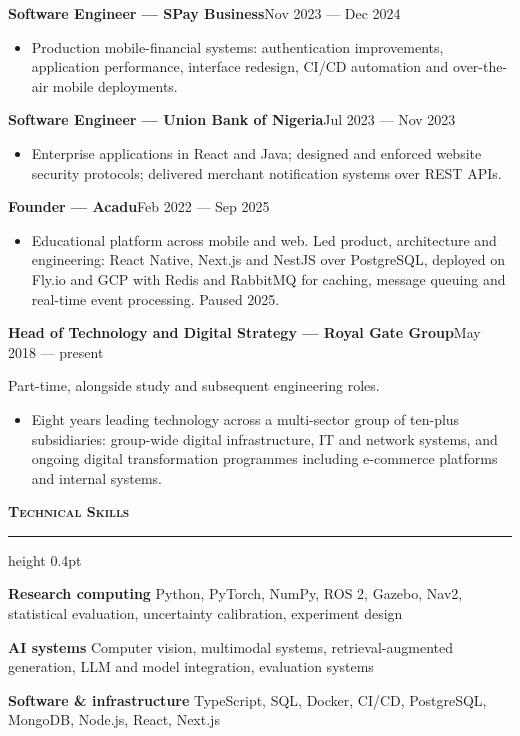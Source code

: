 \documentclass[10pt,a4paper]{article}
\newcommand{\cvsection}[1]{%
  \vspace{0.95em}%
  {\normalsize\bfseries\scshape #1}\par
  \vspace{0.25em}%
  \hrule height 0.4pt
  \vspace{0.6em}%
}
\newcommand{\cventry}[2]{%
  \textbf{#1}\hfill{\small #2}\par\vspace{0.15em}%
}
\newenvironment{cvitems}{%
  \begin{itemize}%
    \setlength{\itemsep}{0.12em}%
    \setlength{\parskip}{0pt}%
    \setlength{\parsep}{0pt}%
    \setlength{\topsep}{0.25em}%
    \setlength{\partopsep}{0pt}%
}{%
  \end{itemize}%
  \vspace{0.25em}%
}
\begin{document}
\cventry{Software Engineer --- SPay Business}{Nov 2023 --- Dec 2024}
\begin{cvitems}
  \item Production mobile-financial systems: authentication improvements,
        application performance, interface redesign, CI/CD automation and
        over-the-air mobile deployments.
\end{cvitems}

\cventry{Software Engineer --- Union Bank of Nigeria}{Jul 2023 --- Nov 2023}
\begin{cvitems}
  \item Enterprise applications in React and Java; designed and enforced website
        security protocols; delivered merchant notification systems over REST
        APIs.
\end{cvitems}

\cventry{Founder --- Acadu}{Feb 2022 --- Sep 2025}
\begin{cvitems}
  \item Educational platform across mobile and web. Led product, architecture
        and engineering: React Native, Next.js and NestJS over PostgreSQL,
        deployed on Fly.io and GCP with Redis and RabbitMQ for caching, message
        queuing and real-time event processing. Paused 2025.
\end{cvitems}

\cventry{Head of Technology and Digital Strategy --- Royal Gate Group}{May 2018 --- present}
{\small Part-time, alongside study and subsequent engineering roles.}
\begin{cvitems}
  \item Eight years leading technology across a multi-sector group of ten-plus
        subsidiaries: group-wide digital infrastructure, IT and network systems,
        and ongoing digital transformation programmes including e-commerce
        platforms and internal systems.
\end{cvitems}


\cvsection{Technical Skills}

{\small
\textbf{Research computing} \quad Python, PyTorch, NumPy, ROS 2, Gazebo, Nav2,
statistical evaluation, uncertainty calibration, experiment design\par
\vspace{0.25em}
\textbf{AI systems} \quad Computer vision, multimodal systems,
retrieval-augmented generation, LLM and model integration, evaluation systems\par
\vspace{0.25em}
\textbf{Software \& infrastructure} \quad TypeScript, SQL, Docker, CI/CD,
PostgreSQL, MongoDB, Node.js, React, Next.js\par
}
\end{document}
